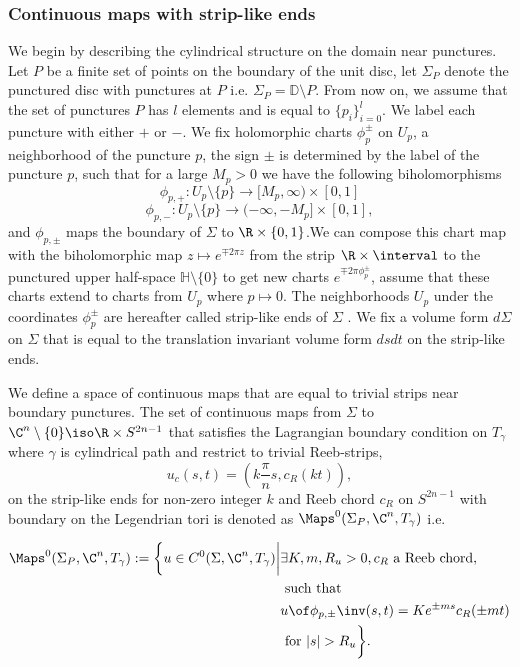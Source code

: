 \subsubsection{Continuous maps with strip-like ends}
We begin by describing the cylindrical structure on the domain near punctures.  Let $P$ be a finite set of points on the boundary of the unit disc, let $\Sigma_P$ denote the punctured disc with punctures at $P$ i.e. $\Sigma_P = \mathbb{D}\setminus P$. From now on, we assume that the set of punctures $P$ has $l$ elements and is equal to $\{p_i\}_{i=0}^l$. We label each puncture with either $+$ or $-$. We  fix holomorphic charts $\phi^\pm_p$ on $U_p$, a neighborhood of the puncture $p$, the sign $\pm$ is determined by  the label of the puncture $p$, such that for a large $M_p >0$ we have the following biholomorphisms $$\phi_{p,+}:U_p\setminus\{p\}\to [M_p,\infty) \times [0,1]$$
$$\phi_{p,-}:U_p\setminus\{p\}\to (-\infty, -M_p] \times [0,1],$$
and  $\phi_{p,\pm}$ maps the boundary of $\Sigma$ to $\R \times \{0,1\}$.We can compose this chart map with the biholomorphic map $z \mapsto e^{\mp 2\pi z}$ from the strip $\R \times \interval$ to the punctured upper half-space $\mathbb{H}\setminus\{0\}$ to get new charts $e^{\mp2\pi\phi^\pm_p}$, assume that these charts extend to charts from $U_p$ where $p \mapsto 0$. The neighborhoods $U_p$ under the coordinates $\phi^\pm_p$ are hereafter  called strip-like ends of $\Sigma$ .  We fix a volume form $d\Sigma$ on $\Sigma$ that is equal to the translation invariant volume form  $dsdt$ on the strip-like ends. 

We define a space of continuous maps that are equal to trivial strips near boundary punctures.  The set of continuous maps from $\Sigma$ to $\C^n \setminus \{0\} \iso \R \times S^{2n-1}$ that satisfies the Lagrangian boundary condition on $T_{\gamma}$ where $\gamma$ is cylindrical path and restrict to trivial Reeb-strips, $$u_c \left( s,t \right) =\left(k\frac{\pi}{n}s,c_{R}(kt) \right),$$
 on the  strip-like ends for non-zero integer $k$ and Reeb chord $c_{R}$ on $S^{2n-1}$ with boundary on the Legendrian tori is denoted as $\Maps^0(\Sigma_P, \C^n , T_\gamma)$ i.e. 
 
 \begin{align*}
     \Maps^0 (\Sigma_P, \C^n , T_\gamma) := \bigg\{ u \in C^0(\Sigma, \C^n, T_\gamma )\bigg| &\exists  K,m,R_u > 0 , c_R  \text{ a Reeb chord}, \\&\text{ such that } \\& u\of \phi_{p,\pm}\inv(s,t)=Ke^{\pm ms}c_{R}(\pm mt) \\&\text{ for  } |s|>R_u  \bigg\}.
 \end{align*}



